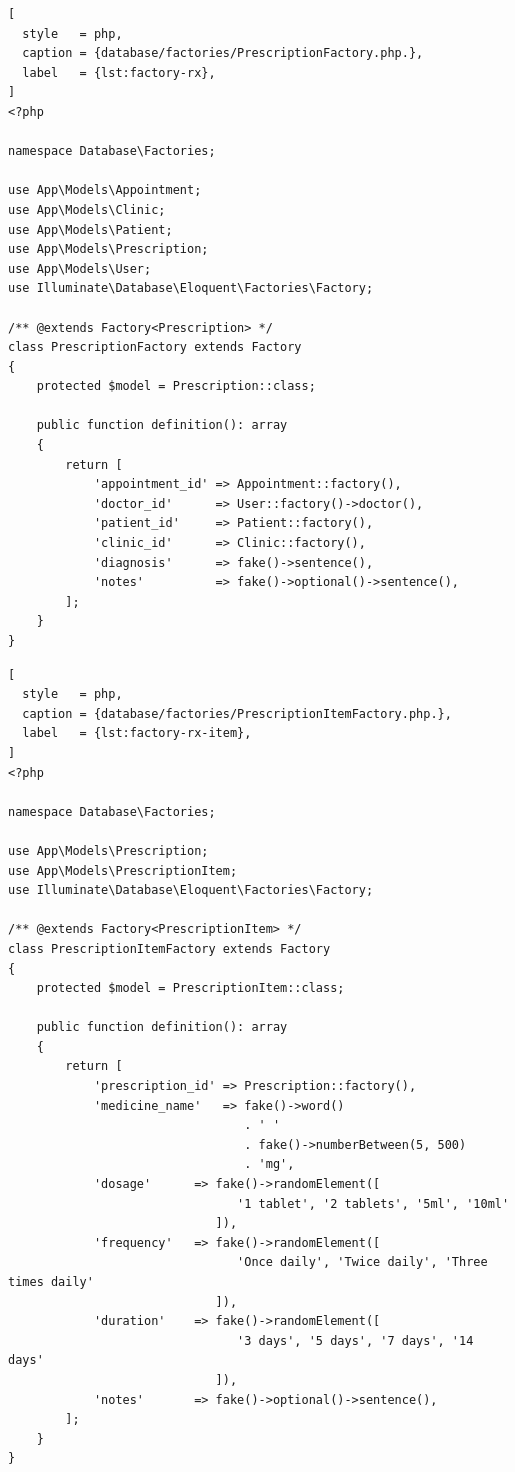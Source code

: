 \begin{lstlisting}[
  style   = php,
  caption = {database/factories/PrescriptionFactory.php.},
  label   = {lst:factory-rx},
]
<?php

namespace Database\Factories;

use App\Models\Appointment;
use App\Models\Clinic;
use App\Models\Patient;
use App\Models\Prescription;
use App\Models\User;
use Illuminate\Database\Eloquent\Factories\Factory;

/** @extends Factory<Prescription> */
class PrescriptionFactory extends Factory
{
    protected $model = Prescription::class;

    public function definition(): array
    {
        return [
            'appointment_id' => Appointment::factory(),
            'doctor_id'      => User::factory()->doctor(),
            'patient_id'     => Patient::factory(),
            'clinic_id'      => Clinic::factory(),
            'diagnosis'      => fake()->sentence(),
            'notes'          => fake()->optional()->sentence(),
        ];
    }
}
\end{lstlisting}

\begin{lstlisting}[
  style   = php,
  caption = {database/factories/PrescriptionItemFactory.php.},
  label   = {lst:factory-rx-item},
]
<?php

namespace Database\Factories;

use App\Models\Prescription;
use App\Models\PrescriptionItem;
use Illuminate\Database\Eloquent\Factories\Factory;

/** @extends Factory<PrescriptionItem> */
class PrescriptionItemFactory extends Factory
{
    protected $model = PrescriptionItem::class;

    public function definition(): array
    {
        return [
            'prescription_id' => Prescription::factory(),
            'medicine_name'   => fake()->word()
                                 . ' '
                                 . fake()->numberBetween(5, 500)
                                 . 'mg',
            'dosage'      => fake()->randomElement([
                                '1 tablet', '2 tablets', '5ml', '10ml'
                             ]),
            'frequency'   => fake()->randomElement([
                                'Once daily', 'Twice daily', 'Three times daily'
                             ]),
            'duration'    => fake()->randomElement([
                                '3 days', '5 days', '7 days', '14 days'
                             ]),
            'notes'       => fake()->optional()->sentence(),
        ];
    }
}
\end{lstlisting}


